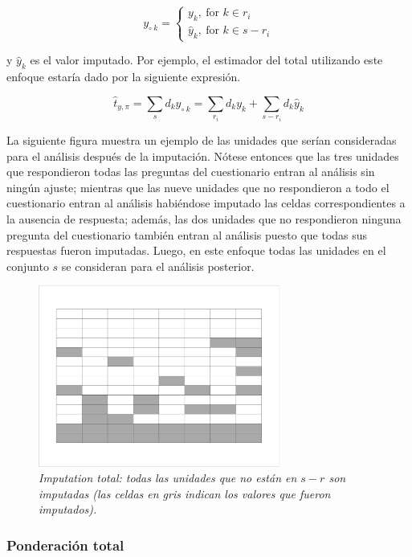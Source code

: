 \documentclass[
  10pt,
  spanish,
]{book}
\begin{document}
\[
y_{\circ \  k} = 
\begin{cases}
y_k, \ \text{for $k \in r_i$} \\
\hat{y}_k, \ \text{for $k \in s - r_i$}
\end{cases}
\]

y \(\hat{y}_k\) es el valor imputado. Por ejemplo, el estimador del total utilizando este enfoque estaría dado por la siguiente expresión.

\[
\hat{t}_{y,\pi} = \sum_s d_{k}y_{\circ \  k}
= \sum_{r_i}d_{k}y_k + \sum_{s - r_i}d_{k}\hat{y}_k
\]

La siguiente figura muestra un ejemplo de las unidades que serían consideradas para el análisis después de la imputación. Nótese entonces que las tres unidades que respondieron todas las preguntas del cuestionario entran al análisis sin ningún ajuste; mientras que las nueve unidades que no respondieron a todo el cuestionario entran al análisis habiéndose imputado las celdas correspondientes a la ausencia de respuesta; además, las dos unidades que no respondieron ninguna pregunta del cuestionario también entran al análisis puesto que todas sus respuestas fueron imputadas. Luego, en este enfoque todas las unidades en el conjunto \(s\) se consideran para el análisis posterior.

\begin{figure}
\centering
\includegraphics[width=3.125in,height=\textheight]{Pics/j3.png}
\caption{\emph{Imputation total: todas las unidades que no están en \(s-r\) son imputadas (las celdas en gris indican los valores que fueron imputados).}}
\end{figure}

\hypertarget{ponderaciuxf3n-total}{%
\subsubsection*{Ponderación total}\label{ponderaciuxf3n-total}}
\end{document}
